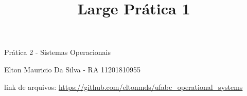 




\frenchspacing 

\textual

	

	\title{Large Prática 1}	
		Prática 2 - Sistemas Operacionais	
		
		Elton Mauricio Da Silva - RA 11201810955

		link de arquivos: \url{https://github.com/eltonmds/ufabc_operational_systems}
	
	



\printindex


